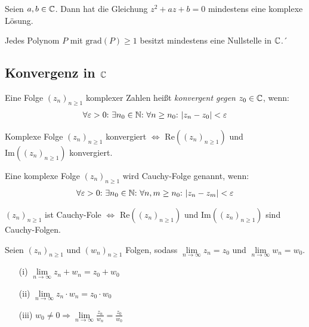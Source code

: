 \begin{framedthm}
	Seien $a,b \in \mathbb{C}$. Dann hat die Gleichung $z^2 + az + b = 0$ mindestens eine komplexe Lösung.
\end{framedthm}

\begin{framedthm}
	Jedes Polynom $P$ mit $\textrm{grad}(P) \geq 1$ besitzt mindestens eine Nullstelle in $\mathbb{C}$.´
\end{framedthm}

\subsection{Konvergenz in $\mathbb{C}$}

\begin{frameddefn}
	Eine Folge $(z_n)_{n\geq 1}$ komplexer Zahlen heißt \textit{konvergent gegen} $z_0 \in \mathbb{C}$, wenn:
	\begin{align*}
		\forall \varepsilon > 0{:}\  \exists n_0 \in \mathbb{N}{:}\  \forall n \geq n_0{:}\  |z_n - z_0| < \varepsilon
	\end{align*}
\end{frameddefn}


\begin{framedthm}
	Komplexe Folge $(z_n)_{n\geq 1}$ konvergiert $\iff$ $\textrm{Re}((z_n)_{n\geq 1})$ und $\textrm{Im}((z_n)_{n\geq 1})$ konvergiert.
\end{framedthm}

\begin{frameddefn}
	Eine komplexe Folge $(z_n)_{n\geq 1}$ wird Cauchy-Folge genannt, wenn:
	\begin{align*}
		\forall \varepsilon > 0{:}\  \exists n_0 \in \mathbb{N}{:}\  \forall n,m \geq n_0{:}\  |z_n - z_m| < \varepsilon
	\end{align*}
\end{frameddefn}

\begin{framedthm}
	$(z_n)_{n\geq 1}$ ist Cauchy-Fole $\iff$ $\textrm{Re}((z_n)_{n\geq 1})$ und $\textrm{Im}((z_n)_{n\geq 1})$ sind Cauchy-Folgen.
\end{framedthm}


\begin{framedthm}
	Seien $(z_n)_{n\geq 1}$ und $(w_n)_{n\geq 1}$ Folgen, sodass $\lim\limits_{n \to \infty} z_n = z_0$ und $\lim\limits_{n \to \infty} w_n = w_0$.
	\begin{enumerate}
		\item[(i)]  $\lim\limits_{n \to \infty} z_n + w_n = z_0 + w_0$
		\item[(ii)]  $\lim\limits_{n \to \infty} z_n \cdot w_n = z_0 \cdot w_0$
		\item[(iii)] $w_0 \neq 0 \Rightarrow \lim\limits_{n \to \infty} \frac{z_n}{w_n} = \frac{z_0}{w_0}$ 
	\end{enumerate}
	
\end{framedthm}


